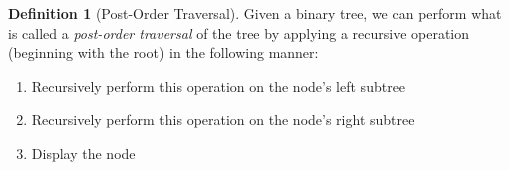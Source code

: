 \documentclass[12pt]{article}
\theoremstyle{definition}
\newtheorem{definition}[theorem]{Definition}
\theoremstyle{remark}
\begin{document}
\begin{definition}[Post-Order Traversal]
Given a binary tree, we can perform what is called a \emph{post-order traversal} of the tree by applying a recursive operation (beginning with the root) in the following manner:
\begin{enumerate}
	\item{Recursively perform this operation on the node's left subtree}
	\item{Recursively perform this operation on the node's right subtree}
	\item{Display the node}
\end{enumerate}
\end{definition}
\end{document}
